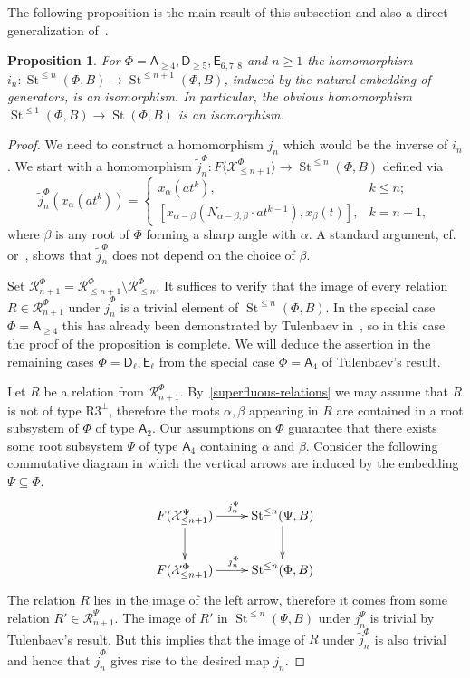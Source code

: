 \documentclass[oneside, 8pt]{amsart}
\newtheorem{prop}[lemma]{Proposition}
\theoremstyle{remark}
\theoremstyle{definition}
\numberwithin{lemma}{section}
\numberwithin{prop}{section}
\numberwithin{corollary}{section}
\numberwithin{externaltheorem}{section}
\DeclareMathOperator{\St}{St}
\newcommand{\rA}{\mathsf{A}}
\newcommand{\rD}{\mathsf{D}}
\newcommand{\rE}{\mathsf{E}}
\numberwithin{equation}{section}
\begin{document}
The following proposition is the main result of this subsection and also a direct generalization of~\cite[Lemma~3.3]{Tu83}.
\begin{prop} \label{lemma33} For $\Phi=\rA_{\geq 4}, \rD_{\geq 5}, \rE_{6,7,8}$ and $n \geq 1$ the homomorphism $i_n\colon \St^{\leq n}(\Phi, B) \to \St^{\leq n+1}(\Phi, B)$, induced by the natural embedding of generators, is an isomorphism. In particular, the obvious homomorphism $\St^{\leq 1}(\Phi, B) \to \St(\Phi, B)$ is an isomorphism. \end{prop}
\begin{proof}
 We need to construct a homomorphism $j_n$ which would be the inverse of $i_n$. 
 We start with a homomorphism $\widetilde{j}_n^\Phi \colon F\langle \mathcal{X}^\Phi_{\leq n+1} \rangle \to \St^{\leq n}(\Phi, B)$ defined via
 \[ \widetilde{j}^{\Phi}_n(x_\alpha(at^k)) = \begin{cases} x_\alpha(at^k), & k\leq n; \\
      [x_{\alpha - \beta} (N_{\alpha-\beta, \beta} \cdot at^{k-1}), x_{\beta}(t)], & k = n+1, \end{cases} \]
 where $\beta$ is any root of $\Phi$ forming a sharp angle with $\alpha$.
 A standard argument, cf. \cite[Proposition~1.1]{Re75} or~\cite[Proposition~3.2.2]{RS76}, shows that $\widetilde{j}^\Phi_n$ does not depend on the choice of $\beta$.
  
 Set $\mathcal{R}^\Phi_{n+1} = \mathcal{R}^\Phi_{\leq n+1} \setminus \mathcal{R}^\Phi_{\leq n}$. It suffices to verify that the image of every relation $R \in \mathcal{R}^\Phi_{n+1}$ under $\widetilde{j}^\Phi_n$ is a trivial element of $\St^{\leq n}(\Phi, B)$. In the special case $\Phi=\rA_{\geq 4}$ this has already been demonstrated by Tulenbaev in~\cite[Lemma~3.3]{Tu83}, so in this case the proof of the proposition is complete. We will deduce the assertion in the remaining cases $\Phi=\rD_\ell,\rE_\ell$ from the special case $\Phi=\rA_4$ of Tulenbaev's result.
 
 Let $R$ be a relation from $\mathcal{R}^\Phi_{n+1}$. By~\cref{superfluous-relations} we may assume that $R$ is not of type $\text{R3}^\bot$, therefore the roots $\alpha, \beta$ appearing in $R$ are contained in a root subsystem of $\Phi$ of type $\rA_2$. Our assumptions on $\Phi$ guarantee that there exists some root subsystem $\Psi$ of type $\rA_4$ containing $\alpha$ and $\beta$. Consider the following commutative diagram in which the vertical arrows are induced by the embedding $\Psi\subseteq\Phi$. 
  \begin{equation} \nonumber \xymatrix{
 F(\mathcal{X}_{\leq n+1}^\Psi) \ar[r]^{j_n^\Psi} \ar[d] & \St^{\leq n}(\Psi, B) \ar[d] \\
 F(\mathcal{X}_{\leq n+1}^\Phi) \ar[r]^{j_n^\Phi} & \St^{\leq n}(\Phi, B) }
 \end{equation}
The relation $R$ lies in the image of the left arrow, therefore it comes from some relation $R' \in \mathcal{R}^\Psi_{n+1}$. The image of $R'$ in $\St^{\leq n}(\Psi, B)$ under $j_n^\Psi$ is trivial by Tulenbaev's result. But this implies that the image of $R$ under $\widetilde{j}_n^\Phi$ is also trivial and hence that $\widetilde{j}_n^\Phi$ gives rise to the desired map $j_n$.
\end{proof}
\end{document}
